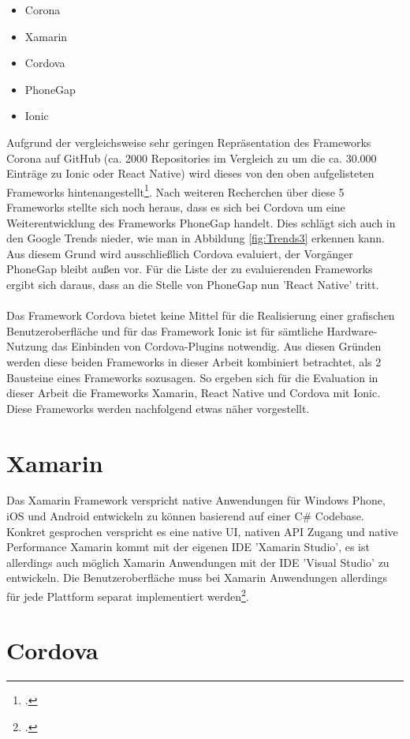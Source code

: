 \begin{itemize}
\item Corona
\item Xamarin
\item Cordova
\item PhoneGap
\item Ionic
\end{itemize}
Aufgrund der vergleichsweise sehr geringen Repräsentation des Frameworks Corona auf GitHub (ca. 2000 Repositories im Vergleich zu um die ca. 30.000 Einträge zu Ionic oder React Native) wird dieses von den oben aufgelisteten Frameworks hintenangestellt\footcite{GitHubTrending}. Nach weiteren Recherchen über diese 5 Frameworks stellte sich noch heraus, dass es sich bei Cordova um eine Weiterentwicklung des Frameworks PhoneGap handelt. Dies schlägt sich auch in den Google Trends nieder, wie man in Abbildung \ref{fig:Trends3} erkennen kann. Aus diesem Grund wird ausschließlich Cordova evaluiert, der Vorgänger PhoneGap bleibt außen vor. Für die Liste der zu evaluierenden Frameworks ergibt sich daraus, dass an die Stelle von PhoneGap nun 'React Native' tritt. 
\\
\\
Das Framework Cordova bietet keine Mittel für die Realisierung einer grafischen Benutzeroberfläche und für das Framework Ionic ist für sämtliche Hardware-Nutzung das Einbinden von Cordova-Plugins notwendig. Aus diesen Gründen werden diese beiden Frameworks in dieser Arbeit kombiniert betrachtet, als 2 Bausteine eines Frameworks sozusagen. So ergeben sich für die Evaluation in dieser Arbeit die Frameworks Xamarin, React Native und Cordova mit Ionic. Diese Frameworks werden nachfolgend etwas näher vorgestellt. 

\section{Xamarin} \label{chpXamarin}

Das Xamarin Framework verspricht native Anwendungen für Windows Phone, iOS und Android entwickeln zu können basierend auf einer C\# Codebase. Konkret gesprochen verspricht es eine native UI, nativen API Zugang und native Performance Xamarin kommt mit der eigenen IDE 'Xamarin Studio', es ist allerdings auch möglich Xamarin Anwendungen mit der IDE 'Visual Studio' zu entwickeln. Die Benutzeroberfläche muss bei Xamarin Anwendungen allerdings für jede Plattform separat implementiert werden\footcite{EinerFuerAlles}. 

\section{Cordova} \label{chpCordova}

